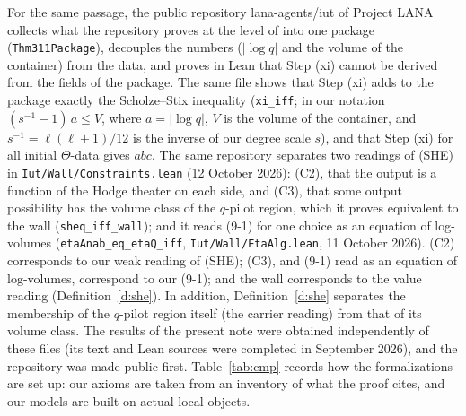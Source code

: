 \documentclass[11pt]{article}
\theoremstyle{plain}
\theoremstyle{definition}
\theoremstyle{remark}
\begin{document}
For the same passage, the public repository lana-agents/iut of Project LANA \cite{lana}
collects what the repository proves at the level of \cite[Thm.~3.11]{IUT3} into one
package (\texttt{Thm311Package}), decouples the numbers ($|\log q|$ and the volume of the
container) from the data, and proves in Lean that Step (xi) cannot be derived from the
fields of the package. The same file shows that Step (xi) adds to the package exactly the
Scholze--Stix inequality (\texttt{xi\_iff}; in our notation $(s^{-1}-1)\,a\le V$, where
$a=|\log q|$, $V$ is the volume of the container, and $s^{-1}=\ell(\ell+1)/12$ is the
inverse of our degree scale $s$), and that Step (xi) for all initial $\Theta$-data gives
$abc$. The same repository separates two readings of (SHE) in
\texttt{Iut/Wall/Constraints.lean} (12 October 2026): (C2), that the output is a function of
the Hodge theater on each side, and (C3), that some output possibility has the volume class
of the $q$-pilot region, which it proves equivalent to the wall (\texttt{sheq\_iff\_wall});
and it reads (9-1) for one choice as an equation of log-volumes
(\texttt{etaAnab\_eq\_etaQ\_iff}, \texttt{Iut/Wall/EtaAlg.lean}, 11 October 2026). (C2)
corresponds to our weak reading of (SHE); (C3), and (9-1) read as an equation of
log-volumes, correspond to our (9-1); and the wall corresponds to the value reading
(Definition~\ref{d:she}). In addition, Definition~\ref{d:she} separates the membership of
the $q$-pilot region itself (the carrier reading) from that of its volume class. The
results of the present note were obtained independently of these files (its text and Lean
sources were completed in September 2026), and the repository was made public first.
Table~\ref{tab:cmp} records how the formalizations are set up: our axioms are taken from
an inventory of what the proof cites, and our models are built on actual local objects.
\end{document}

